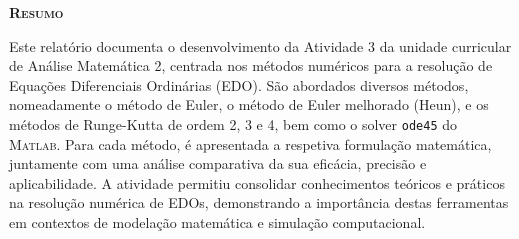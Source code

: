 
\vspace*{45pt}
\begin{flushleft}
	{\Large \textbf{\scshape{Resumo}}}
\end{flushleft}
\vspace*{10pt}

\begin{resumo}
Este relatório documenta o desenvolvimento da Atividade 3 da unidade curricular de Análise Matemática 2, centrada nos métodos numéricos para a resolução de Equações Diferenciais Ordinárias (EDO). São abordados diversos métodos, nomeadamente o método de Euler, o método de Euler melhorado (Heun), e os métodos de Runge-Kutta de ordem 2, 3 e 4, bem como o solver \texttt{ode45} do \textsc{Matlab}. Para cada método, é apresentada a respetiva formulação matemática, juntamente com uma análise comparativa da sua eficácia, precisão e aplicabilidade. A atividade permitiu consolidar conhecimentos teóricos e práticos na resolução numérica de EDOs, demonstrando a importância destas ferramentas em contextos de modelação matemática e simulação computacional.
\end{resumo}